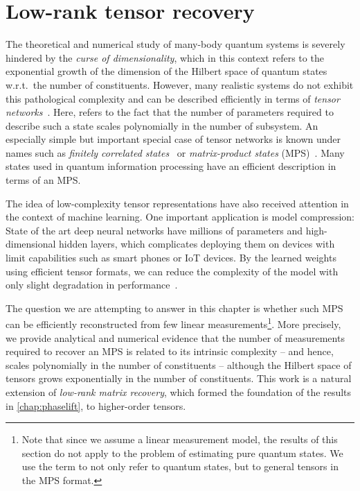 
\chapter{Low-rank tensor recovery}%
\label{chap:tensors}


The theoretical and numerical study of many-body quantum systems is severely hindered by the \emph{curse of dimensionality}, which in this context refers to the exponential growth of the dimension of the Hilbert space of quantum states w.r.t.\ the number of constituents.
However, many realistic systems do not exhibit this pathological complexity and can be described efficiently in terms of \emph{tensor networks}~\cite{Bridgeman_2017_HandWaving,Orus_2014_Practical}.
Here,  refers to the fact that the number of parameters required to describe such a state scales polynomially in the number of subsystem.
An especially simple but important special case of tensor networks is known under names such as \emph{finitely correlated states}~\cite{Fannes_1992_Finitely} or \emph{matrix-product states} (MPS)~\cite{Garcia_2006_Matrix,Verstraete_2008_Matrix}.
Many states used in quantum information processing have an efficient description in terms of an MPS.

The idea of low-complexity tensor representations have also received attention in the context of machine learning.
One important application is model compression:
State of the art deep neural networks have millions of parameters and high-dimensional hidden layers, which complicates deploying them on devices with limit capabilities such as smart phones or IoT devices.
By  the learned weights using efficient tensor formats, we can reduce the complexity of the model with only slight degradation in performance~\cite{Novikov_2015_Tensorizing,Tai_2015_Convolutional,Yang_2016_Deep}.

The question we are attempting to answer in this chapter is whether such MPS can be efficiently reconstructed from few linear measurements\footnote{%
  Note that since we assume a linear measurement model, the results of this section do not apply to the problem of estimating pure quantum states.
  We use the term  to not only refer to quantum states, but to general tensors in the MPS format.
}.
More precisely, we provide analytical and numerical evidence that the number of measurements required to recover an MPS is related to its intrinsic complexity -- and hence, scales polynomially in the number of constituents -- although the Hilbert space of tensors grows exponentially in the number of constituents.
This work is a natural extension of \emph{low-rank matrix recovery}, which formed the foundation of the results in \cref{chap:phaselift}, to higher-order tensors.\\



